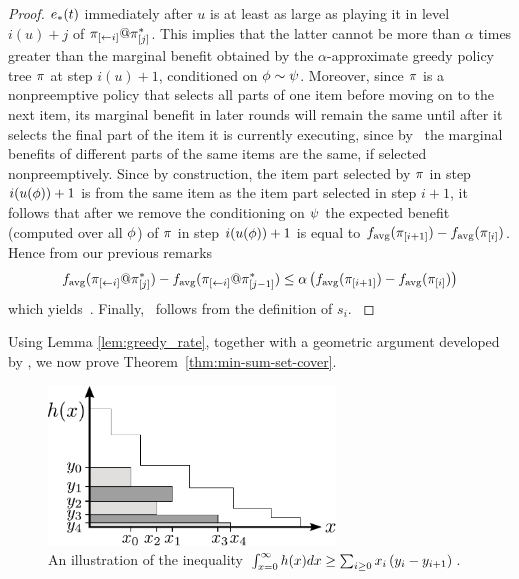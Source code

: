 \begin{proof}
{${e_*}\! \left( {{t}} \right) $ immediately after $u$ is at least as large as playing
it in level $i(u)+j$ of
${ \pi_{[\gets{i}] }}@{ \pi^*_{[{j}]} }$.  
This implies that the latter cannot be more than $\alpha$ times greater than
the marginal benefit obtained by the $\alpha$-approximate greedy
policy tree $\pi$ at step $i(u)+1$, conditioned on ${\color{black}{\ensuremath{\phi}}} \sim {\color{black}{\ensuremath{\psi}}}$.  
Moreover, since $\pi$ is a nonpreemptive policy that selects all parts
of one item before moving on to the next item, its marginal benefit in
later rounds will remain the same until after it selects the final
part of the item it is currently executing, since
by~ the marginal benefits of different parts of the
same items are the same, if selected nonpreemptively.  Since by construction, the item part
selected by $\pi$ in step $i(u({\color{black}{\ensuremath{\phi}}}))+1$ is from the same item as the
item part selected in step $i+1$, it follows that after we remove the
conditioning on ${\color{black}{\ensuremath{\psi}}}$ the expected benefit
(computed over all ${\color{black}{\ensuremath{\phi}}}$) of $\pi$ in step $i(u({\color{black}{\ensuremath{\phi}}}))+1$ is equal to 
$f_{\text{avg}}( \pi_{[{i+1}]} ) - f_{\text{avg}}( \pi_{[{i}]} )$.  Hence from our
previous remarks
$$ f_{\text{avg}}({ \pi_{[\gets{i}] }}@{ \pi^*_{[{j}]} }) -
                  f_{\text{avg}}({ \pi_{[\gets{i}] }}@{ \pi^*_{[{j-1}]} }) \le \alpha  \left( {f_{\text{avg}}( \pi_{[{i+1}]} ) - f_{\text{avg}}( \pi_{[{i}]} )} \right) $$ 
which yields~.  Finally,~ follows from
the definition of $s_i$.
%
} %
%
\end{proof}

\noindent
Using Lemma \ref{lem:greedy_rate}, together with a geometric argument
developed by \citet{feige04}, we now prove
Theorem~\ref{thm:min-sum-set-cover}. \\

%
%
%
%

%
%
%
%
%

%
\begin {figure} [t!]
	\begin {center}
		\includegraphics [width=3in]{figs/minsum} %
	\end {center}
	\caption {An illustration of the inequality
          $\int_{x=0}^{\infty} h(x) dx \ge \sum_{i \ge 0} x_i  \left( { y_i - y_{i+1} } \right) $.}
	\label {fig:proof_by_picture}
\end {figure}
%

